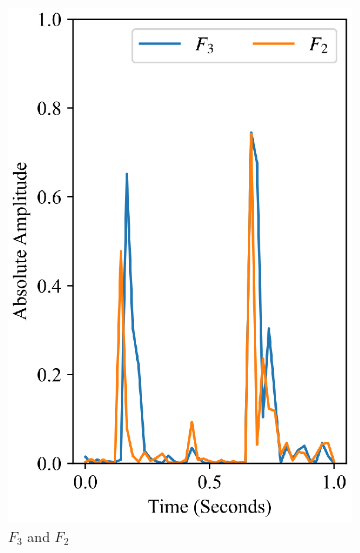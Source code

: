 \begin{figure}[ht]   
    \centering
    \begin{subfigure}{0.24\textwidth}
        \includegraphics[width=\linewidth]{Figures/chap4/proposed/f3af2.eps}        
        \caption{$F_3$ and $F_2$}
        \label{fig:f3af2}
    \end{subfigure}
    \begin{subfigure}{0.24\textwidth}

\end{subfigure}
\end{figure}
